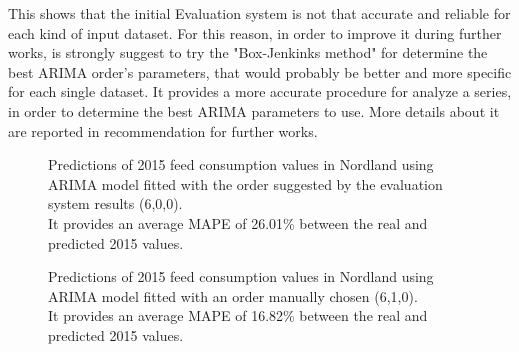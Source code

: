 This shows that the initial Evaluation system is not that accurate and reliable for each kind of input dataset. For this reason, in order to improve it during further works, is strongly suggest to try the "Box-Jenkinks method" for determine the best ARIMA order's parameters, that would probably be better and more specific for each single dataset. It provides a more accurate procedure for analyze a series, in order to determine the best ARIMA parameters to use. More details about it are reported in recommendation for further works.


\newpage

\begin{figure}[H]
    \caption[Predicted 2015 feed consumption in Nordland. Evaluation system ARIMA order.]{Predictions of 2015 feed consumption values in Nordland using ARIMA model fitted with the order suggested by the evaluation system results (6,0,0).\\  It provides an average MAPE of 26.01\% between the real and predicted 2015 values. }
    \label{fig: Nordland_ARIMAevaluation}
\end{figure}

\begin{figure}[H]
    \caption[Predicted 2015 feed consumption in Nordland. Manual ARIMA order.]{Predictions of 2015 feed consumption values in Nordland using ARIMA model fitted with an order manually chosen (6,1,0).\\  It provides an average MAPE of 16.82\% between the real and predicted 2015 values. }
    \label{fig: Nordland_ARIMAmanual}
\end{figure}


